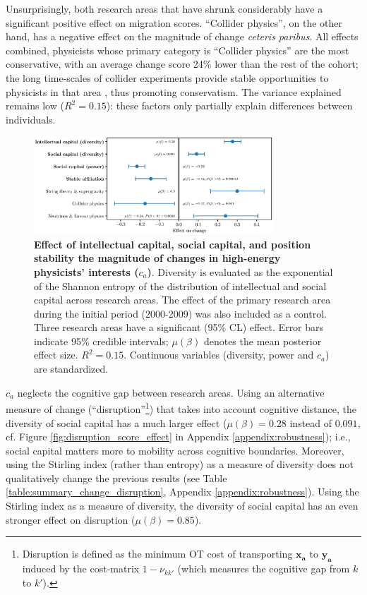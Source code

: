 \documentclass{article}
\begin{document}
Unsurprisingly, both research areas that have shrunk considerably have a significant positive effect on migration scores. ``Collider physics'', on the other hand, has a negative effect on the magnitude of change \textit{ceteris paribus}. All effects combined, physicists whose primary category is ``Collider physics'' are the most conservative, with an average change score 24\% lower than the rest of the cohort; the long time-scales of collider experiments provide stable opportunities to physicists in that area \citep[p.~138]{galison1987how}, thus promoting conservatism. The variance explained remains low ($R^2=0.15$): these factors only partially explain differences between individuals.

\begin{figure}[h]
    \centering
    \includegraphics[width=0.8\textwidth]{plots/Fig5.eps}
    \caption{\textbf{Effect of intellectual capital, social capital, and position stability the magnitude of changes in high-energy physicists' interests ($c_a$)}. Diversity is evaluated as the exponential of the Shannon entropy of the distribution of intellectual and social capital across research areas. The effect of the primary research area during the initial period (2000-2009) was also included as a control. Three research areas have a significant (95\% CL) effect. Error bars indicate 95\% credible intervals; $\mu(\beta)$ denotes the mean posterior effect size. $R^2=0.15$. Continuous variables (diversity, power and $c_a$) are standardized.}
    \label{fig:change_score_effect}
\end{figure}

$c_a$ neglects the cognitive gap between research areas. Using an alternative measure of change (``disruption''\footnote{Disruption is defined as the minimum OT cost of transporting $\bm{x_a}$ to $\bm{y_a}$ \citep{Peyr2019} induced by the cost-matrix $1-\nu_{kk'}$ (which measures the cognitive gap from $k$ to $k'$).}) that takes into account cognitive distance, the diversity of social capital has a much larger effect ($\mu(\beta)=0.28$ instead of $0.091$, cf. Figure \ref{fig:disruption_score_effect} in Appendix \ref{appendix:robustness}); i.e., social capital matters more to mobility across cognitive boundaries.  Moreover, using the Stirling index (rather than entropy) as a measure of diversity does not qualitatively change the previous results (see Table \ref{table:summary_change_disruption}, Appendix \ref{appendix:robustness}). Using the Stirling index as a measure of diversity, the diversity of social capital has an even stronger effect on disruption ($\mu(\beta)=0.85$). 
\end{document}
